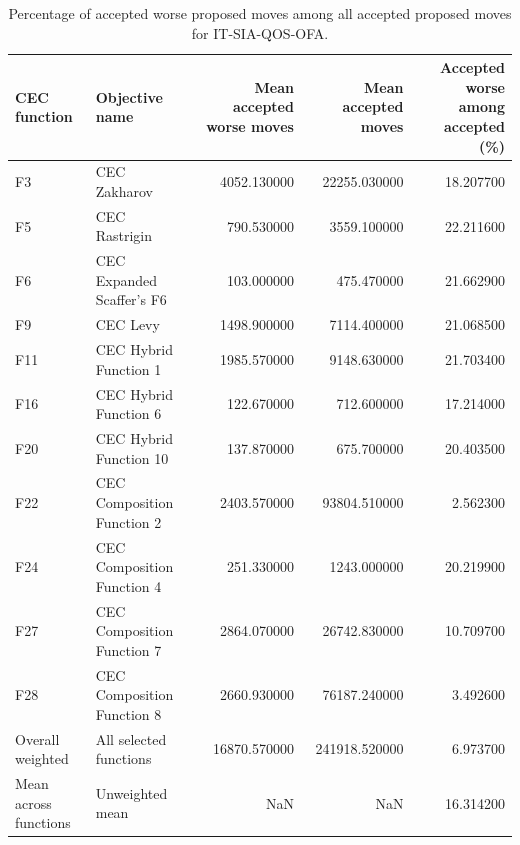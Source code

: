 \begin{table}
\caption{Percentage of accepted worse proposed moves among all accepted proposed moves for IT-SIA-QOS-OFA.}
\label{tab:it_sia_accepted_worse_percentage}
\begin{tabular}{llrrr}
\toprule
CEC function & Objective name & Mean accepted worse moves & Mean accepted moves & Accepted worse among accepted (\%) \\
\midrule
F3 & CEC Zakharov & 4052.130000 & 22255.030000 & 18.207700 \\
F5 & CEC Rastrigin & 790.530000 & 3559.100000 & 22.211600 \\
F6 & CEC Expanded Scaffer's F6 & 103.000000 & 475.470000 & 21.662900 \\
F9 & CEC Levy & 1498.900000 & 7114.400000 & 21.068500 \\
F11 & CEC Hybrid Function 1 & 1985.570000 & 9148.630000 & 21.703400 \\
F16 & CEC Hybrid Function 6 & 122.670000 & 712.600000 & 17.214000 \\
F20 & CEC Hybrid Function 10 & 137.870000 & 675.700000 & 20.403500 \\
F22 & CEC Composition Function 2 & 2403.570000 & 93804.510000 & 2.562300 \\
F24 & CEC Composition Function 4 & 251.330000 & 1243.000000 & 20.219900 \\
F27 & CEC Composition Function 7 & 2864.070000 & 26742.830000 & 10.709700 \\
F28 & CEC Composition Function 8 & 2660.930000 & 76187.240000 & 3.492600 \\
Overall weighted & All selected functions & 16870.570000 & 241918.520000 & 6.973700 \\
Mean across functions & Unweighted mean & NaN & NaN & 16.314200 \\
\bottomrule
\end{tabular}
\end{table}
